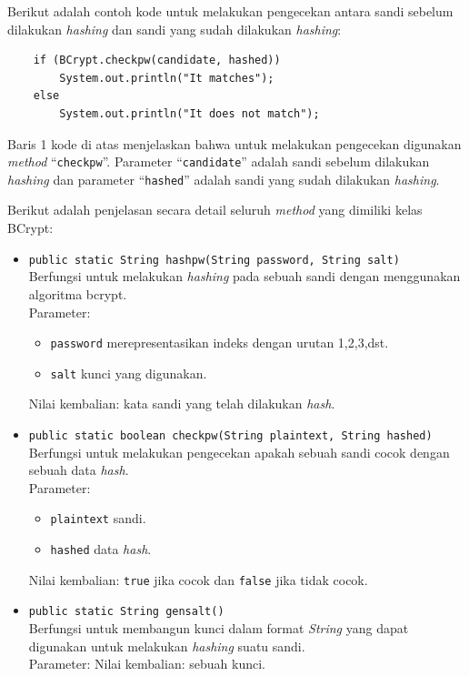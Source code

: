 Berikut adalah contoh kode untuk melakukan pengecekan antara sandi sebelum dilakukan \textit{hashing} dan sandi yang sudah dilakukan \textit{hashing}:
\begin{lstlisting}
	if (BCrypt.checkpw(candidate, hashed))
		System.out.println("It matches");
	else
		System.out.println("It does not match");
\end{lstlisting}

Baris 1 kode di atas menjelaskan bahwa untuk melakukan pengecekan digunakan \textit{method} ``\texttt{checkpw}''. Parameter ``\texttt{candidate}'' adalah sandi sebelum dilakukan \textit{hashing} dan parameter ``\texttt{hashed}'' adalah sandi yang sudah dilakukan \textit{hashing}. 

Berikut adalah penjelasan secara detail seluruh \textit{method} yang dimiliki kelas BCrypt:
\begin{itemize}
	\item \texttt{public static String hashpw(String password, String salt)}\\
		Berfungsi untuk melakukan \textit{hashing} pada sebuah sandi dengan menggunakan algoritma bcrypt.\\
		Parameter:
		\begin{itemize}
			\item \texttt{password} merepresentasikan indeks dengan urutan 1,2,3,dst.
			\item \texttt{salt} kunci yang digunakan.
		\end{itemize}
		Nilai kembalian: kata sandi yang telah dilakukan \textit{hash}.
	\item \texttt{public static boolean checkpw(String plaintext, String hashed)}\\
		Berfungsi untuk melakukan pengecekan apakah sebuah sandi cocok dengan sebuah data \textit{hash}.\\
		Parameter:
		\begin{itemize}
			\item \texttt{plaintext} sandi.
			\item \texttt{hashed} data \textit{hash}.
		\end{itemize}
		Nilai kembalian: \texttt{true} jika cocok dan \texttt{false} jika tidak cocok.
	\item \texttt{public static String gensalt()}\\
		Berfungsi untuk membangun kunci dalam format \textit{String} yang dapat digunakan untuk melakukan \textit{hashing} suatu sandi.\\
		Parameter:
		Nilai kembalian: sebuah kunci.
\end{itemize}
